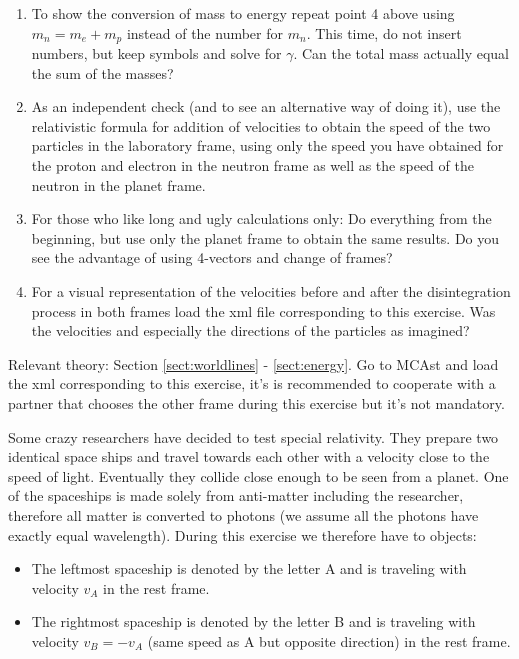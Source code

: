 {\begin{multicols}{2}
\begin{enumerate}
\item To show the conversion of mass to energy repeat point 4 above using $m_n = m_e + m_p$ instead of the number for $m_n$. This time, do not insert numbers, but keep symbols and solve for $\gamma$. Can the total mass actually equal the sum of the masses?
\item As an independent check (and to see an alternative way of doing it), use the relativistic formula for addition of velocities to obtain the speed of the two particles in the laboratory frame, using only the speed you have obtained for the proton and electron in the neutron frame as well as the speed of the neutron in the planet frame.
\item For those who like long and ugly calculations only: Do everything from the beginning, but use only the planet frame to obtain the same results. Do you see the advantage of using 4-vectors and change of frames?
\item For a visual representation of the velocities before and after the disintegration process in both frames load the xml file corresponding to this exercise. Was the velocities and especially the directions of the particles as imagined?
\end{enumerate}


\vspace{0.5cm}

 
Relevant theory: Section \ref{sect:worldlines} - \ref{sect:energy}.\newline
Go to MCAst and load the xml corresponding to this exercise, it's is recommended to cooperate with a partner that chooses the other frame during this exercise but it's not mandatory.

Some crazy researchers have decided to test special relativity. They prepare two identical space ships and travel towards each other with a velocity close to the speed of light. Eventually they collide close enough to be seen from a planet. One of the spaceships is made solely from anti-matter including the researcher, therefore all matter is converted to photons (we assume all the photons have exactly equal wavelength). During this exercise we therefore have to objects:
\begin{itemize}
\item The leftmost spaceship is denoted by the letter A and is traveling with velocity $v_A$ in the rest frame.
\item The rightmost spaceship is denoted by the letter B and is traveling with velocity $v_B=-v_A$ (same speed as A but opposite direction) in the rest frame.
\end{itemize}


\end{multicols}}
